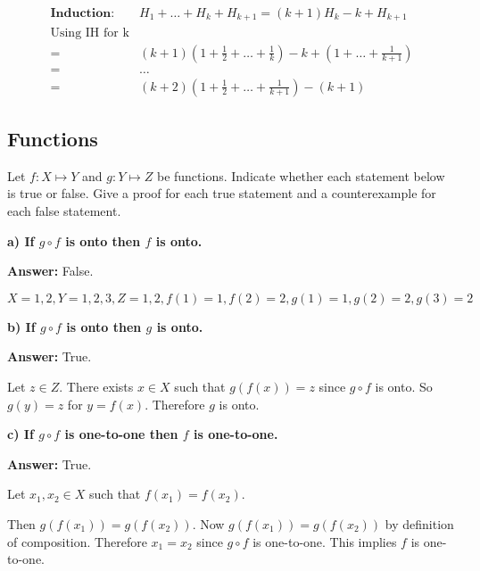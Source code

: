\documentclass[landscape, letterpaper, 8pt]{extarticle}
\begin{document}
\begin{multicols}{3}
\begin{example}
        \begin{equation*}
            \begin{aligned}
                \textbf{Induction: } & H_1 + \ldots + H_k + H_{k+1} = (k+1)H_k - k + H_{k+1}                  \\
                \text{Using IH for k}                                                                         \\
                =                    & (k+1)(1+\frac{1}{2}+\ldots+\frac{1}{k})-k  +(1+\ldots + \frac{1}{k+1}) \\
                =                    & \ldots                                                                 \\
                =                    & (k+2) (1+\frac{1}{2} + \ldots + \frac{1}{k+1}) - (k+1)
            \end{aligned}
        \end{equation*}
    \end{example}
    \subsection*{Functions}
    Let $f: X \mapsto Y$ and $g: Y \mapsto Z$ be functions. Indicate whether each statement below is true or false. Give a proof for each true statement and a counterexample for each false statement.

    \textbf{a) If $g \circ f$ is onto then $f$ is onto.}

    \textbf{Answer: } False.

    $X = {1, 2}, Y = {1, 2, 3}, Z = {1, 2}, f(1) = 1, f(2) = 2, g(1) = 1, g(2) = 2, g(3) = 2$

    \textbf{b) If $g \circ f$ is onto then $g$ is onto.}

    \textbf{Answer: } True.

    Let $z \in Z$. There exists $x \in X$ such that $g(f(x)) = z$ since $g \circ f$ is onto. So $g(y) = z$ for $y = f(x)$. Therefore $g$ is onto.

    \textbf{c) If $g \circ f$ is one-to-one then $f$ is one-to-one.}

    \textbf{Answer: } True.

    Let $x_1, x_2 \in X$ such that $f(x_1) = f(x_2)$.
    
    Then $g(f(x_1)) = g(f(x_2))$. Now $g(f(x_1)) = g(f(x_2))$ by definition of composition. Therefore $x_1 = x_2$ since $g \circ f$ is one-to-one. This implies $f$ is one-to-one.


\end{multicols}
\end{document}
